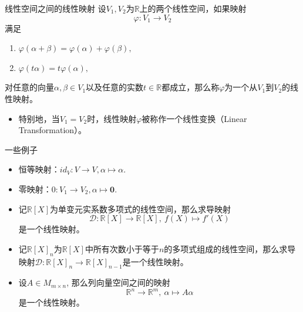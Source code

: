 \begin{frame}

\begin{block}{线性空间之间的线性映射}
设$V_1, V_2$为$\mathbb{R}$上的两个线性空间，如果映射
\[\varphi: V_1 \longrightarrow V_2\]
满足
\begin{enumerate}
\item $\varphi(\alpha + \beta) = \varphi(\alpha) + \varphi(\beta),$
\item $\varphi(t\alpha) = t\varphi(\alpha),$
\end{enumerate}
对任意的向量$\alpha,\beta\in V_1$以及任意的实数$t\in\mathbb{R}$都成立，那么称$\varphi$为一个从$V_1$到$V_2$的线性映射。

\vspace{2em}
\pause

\begin{itemize}
\item 特别地，当$V_1 = V_2$时，线性映射$\varphi$被称作一个线性变换（Linear Transformation）。
\end{itemize}
\end{block}

\end{frame}


\begin{frame}

\begin{block}{一些例子}
\begin{itemize}
\item 恒等映射：$id_V: V \to V, \alpha \mapsto \alpha$.
\item 零映射：$0: V_1 \to V_2, \alpha \mapsto \mathbf{0}$.
\pause
\item 记$\mathbb{R}[X]$为单变元实系数多项式的线性空间，那么求导映射
\[
\mathscr{D}: \mathbb{R}[X] \rightarrow \mathbb{R}[X], \  f(X) \mapsto f'(X)
\]
是一个线性映射。
\item 记$\mathbb{R}[X]_n$为$\mathbb{R}[X]$中所有次数小于等于$n$的多项式组成的线性空间，那么求导映射$\mathscr{D}: \mathbb{R}[X]_n \to \mathbb{R}[X]_{n-1}$是一个线性映射。
\pause
\item 设$A\in M_{m\times n}$, 那么列向量空间之间的映射
\[
\mathbb{R}^n \to \mathbb{R}^m, \ \alpha \mapsto A\alpha
\]
是一个线性映射。
\end{itemize}
\end{block}

\end{frame}

